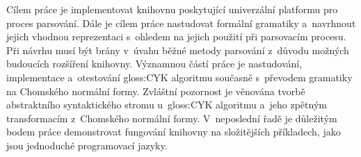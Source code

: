 	Cílem práce je implementovat knihovnu poskytující univerzální platformu pro proces parsování. Dále je cílem práce nastudovat formální gramatiky a~navrhnout jejich vhodnou reprezentaci s~ohledem na jejich použití při parsovacím procesu. Při návrhu musí být brány v~úvahu běžné metody parsování z~důvodu možných budoucích rozšíření knihovny. Významnou částí práce je nastudování, implementace a~otestování \gls{gloss:CYK} algoritmu současně s~převodem gramatiky na Chomského normální formy. Zvláštní pozornost je věnována tvorbě abstraktního syntaktického stromu u~\gls{gloss:CYK} algoritmu a~jeho zpětným transformacím z~Chomského normální formy. V~neposlední řadě je důležitým bodem práce demonstrovat fungování knihovny na složitějších příkladech, jako jsou jednoduché programovací jazyky.

	